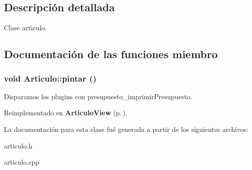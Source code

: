 \subsection{Descripci\'{o}n detallada}
Clase art\'{\i}culo. 



\subsection{Documentaci\'{o}n de las funciones miembro}
\subsubsection{\setlength{\rightskip}{0pt plus 5cm}void Articulo::pintar ()\hspace{0.3cm}{\tt  [virtual]}}\label{classArticulo_a15}


Disparamos los plugins con presupuesto\_\-imprimir\-Presupuesto. 

Reimplementado en {\bf Articulo\-View} {\rm (p.\,\pageref{classArticuloView_a7})}.

La documentaci\'{o}n para esta clase fu\'{e} generada a partir de los siguientes archivos:\begin{CompactItemize}
\item 
articulo.h\item 
articulo.cpp\end{CompactItemize}
